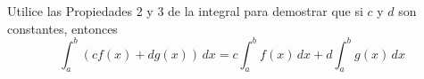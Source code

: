 \item Utilice las Propiedades 2 y 3 de la integral para demostrar que si $c$ y $d$ son constantes, entonces
$$\int_a^b (cf(x) + dg(x)) \, dx = c \int_a^b f(x) \, dx + d \int_a^b g(x) \, dx$$
